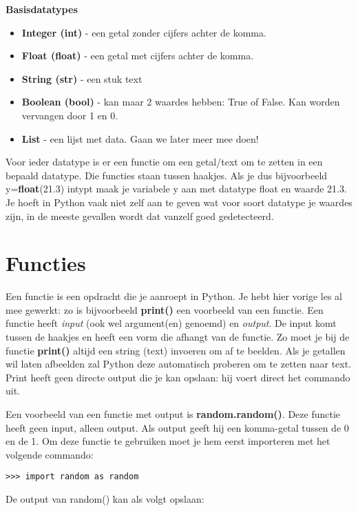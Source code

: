 \textbf{Basisdatatypes}
\begin{itemize}
\item \textbf{Integer (int)} - een getal zonder cijfers achter de komma.
\item \textbf{Float (float)} - een getal met cijfers achter de komma.
\item \textbf{String (str)} - een stuk text
\item \textbf{Boolean (bool)} - kan maar 2 waardes hebben: True of False. Kan worden vervangen door 1 en 0. 
\item \textbf{List} - een lijst met data. Gaan we later meer mee doen!
\end{itemize}

Voor ieder datatype is er een functie om een getal/text om te zetten in een bepaald datatype. Die functies staan tussen haakjes. Als je dus bijvoorbeeld y=\textbf{float}(21.3) intypt maak je variabele y aan met datatype float en waarde 21.3. Je hoeft in Python vaak niet zelf aan te geven wat voor soort datatype je waardes zijn, in de meeste gevallen wordt dat vanzelf goed gedetecteerd.

\section{Functies}

Een functie is een opdracht die je aanroept in Python. Je hebt hier vorige les al mee gewerkt: zo is bijvoorbeeld \textbf{print()} een voorbeeld van een functie. Een functie heeft  \textit{input} (ook wel argument(en) genoemd) en \textit{output}. De input komt tussen de haakjes en heeft een vorm die afhangt van de functie. Zo moet je bij de functie \textbf{print()}  altijd een string (text) invoeren om af te beelden. Als je getallen wil laten afbeelden zal Python deze automatisch proberen om te zetten naar text. Print heeft geen directe output die je kan opslaan: hij voert direct het commando uit.

Een voorbeeld van een functie met output is \textbf{random.random()}. Deze functie heeft geen input, alleen output. Als output geeft hij een komma-getal tussen de 0 en de 1. Om deze functie te gebruiken moet je hem eerst importeren met het volgende commando:

\begin{lstlisting}[frame=single]
>>> import random as random
\end{lstlisting}

De output van random() kan als volgt opslaan:

